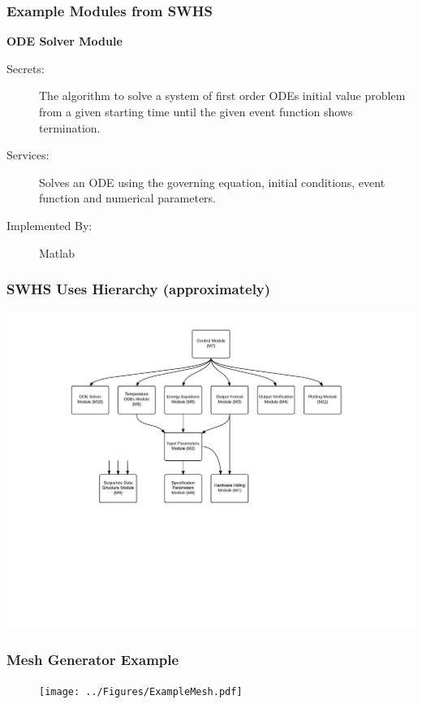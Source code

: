 \documentclass[t, 12pt, numbers, fleqn, handout]{beamer}
\begin{document}
\begin{frame}
\frametitle{Example Modules from SWHS}

\textbf{ODE Solver Module}

\begin{description}
\item[Secrets:] The algorithm to solve a system of first order ODEs initial
  value problem from a given starting time until the given event function shows
  termination.
\item[Services:] Solves an ODE using the governing equation, initial
  conditions, event function and numerical parameters.
\item[Implemented By:] Matlab
\end{description}

\end{frame}


\begin{frame}

\frametitle{SWHS Uses Hierarchy (approximately)}

\begin{center}
\includegraphics[scale=0.55]{../Figures/RevisedHierarchy.pdf}
\end{center}

\end{frame}


\begin{frame}
\frametitle{Mesh Generator Example}
\vspace{-1cm}
\begin{figure}[H]
\texttt{[image: ../Figures/ExampleMesh.pdf]}
\end{figure}\end{frame}
\end{document}
